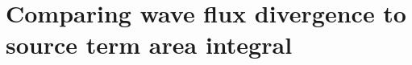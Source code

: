 \section{Comparing wave flux divergence to source term area integral}\label{appendix:flux-vs-area}

